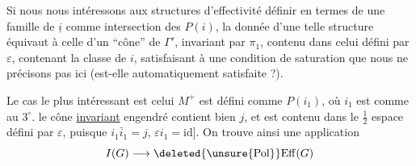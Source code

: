 
Si nous nous intéressons aux structures d'effectivité  définir  en termes de  une famille de $\underline{i}$ comme intersection des $P(i)$,  la donnée d'une telle structure équivaut à celle d'un ``cône'' de $\Gamma'$, invariant par $\pi_1$, contenu  dans celui défini par $\varepsilon$,
contenant la classe de $i$, satisfaisant à une condition de  saturation que nous ne précisons pas ici (est-elle automatiquement satisfaite ?).

Le cas le plus intéressant est celui   $M^+$  est défini comme $P(i_1)$, où $i_1$ est comme au $3^{\circ}$.  \inserted{[N.B.} le cône \uline{invariant} engendré contient bien $j$, et est contenu dans le $\frac12$ espace défini par $\varepsilon$, puisque $i_1\bar i_1=j$, $\varepsilon i_1=\mathrm{id}$]. On trouve ainsi une application
\[
I(G)\longrightarrow\deleted{\unsure{\mathrm{Pol}}}\mathrm{Eff}(G)
\]
